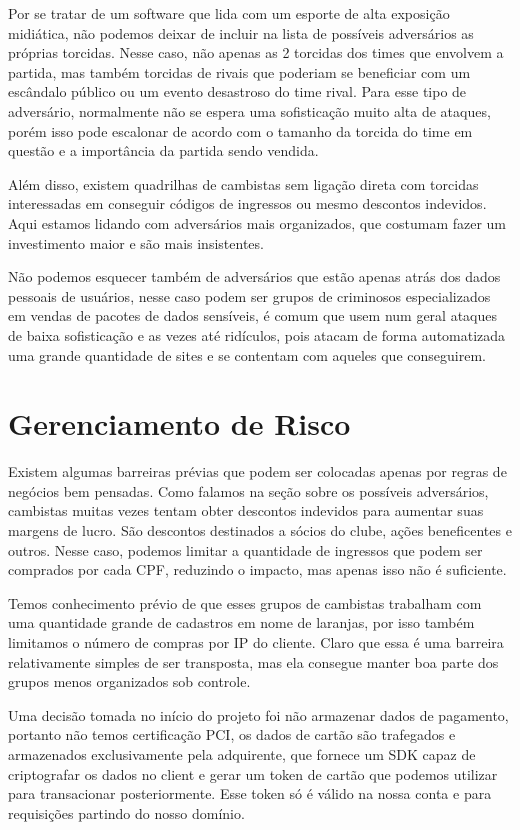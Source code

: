 \documentclass[12pt]{article}
\begin{document}
Por se tratar de um software que lida com um esporte de alta exposição midiática, não podemos deixar de incluir na lista de possíveis adversários as próprias torcidas. Nesse caso, não apenas as 2 torcidas dos times que envolvem a partida, mas também torcidas de rivais que poderiam se beneficiar com um escândalo público ou um evento desastroso do time rival. Para esse tipo de adversário, normalmente não se espera uma sofisticação muito alta de ataques, porém isso pode escalonar de acordo com o tamanho da torcida do time em questão e a importância da partida sendo vendida.

Além disso, existem quadrilhas de cambistas sem ligação direta com torcidas interessadas em conseguir códigos de ingressos ou mesmo descontos indevidos. Aqui estamos lidando com adversários mais organizados, que costumam fazer um investimento maior e são mais insistentes.

Não podemos esquecer também de adversários que estão apenas atrás dos dados pessoais de usuários, nesse caso podem ser grupos de criminosos especializados em vendas de pacotes de dados sensíveis, é comum que usem num geral ataques de baixa sofisticação e as vezes até ridículos, pois atacam de forma automatizada uma grande quantidade de sites e se contentam com aqueles que conseguirem.

\section*{Gerenciamento de Risco}

Existem algumas barreiras prévias que podem ser colocadas apenas por regras de negócios bem pensadas. Como falamos na seção sobre os possíveis adversários, cambistas muitas vezes tentam obter descontos indevidos para aumentar suas margens de lucro. São descontos destinados a sócios do clube, ações beneficentes e outros. Nesse caso, podemos limitar a quantidade de ingressos que podem ser comprados por cada CPF, reduzindo o impacto, mas apenas isso não é suficiente. 

Temos conhecimento prévio de que esses grupos de cambistas trabalham com uma quantidade grande de cadastros em nome de laranjas, por isso também limitamos o número de compras por IP do cliente. Claro que essa é uma barreira relativamente simples de ser transposta, mas ela consegue manter boa parte dos grupos menos organizados sob controle.

Uma decisão tomada no início do projeto foi não armazenar dados de pagamento, portanto não temos certificação PCI, os dados de cartão são trafegados e armazenados exclusivamente pela adquirente, que fornece um SDK capaz de criptografar os dados no client e gerar um token de cartão que podemos utilizar para transacionar posteriormente. Esse token só é válido na nossa conta e para requisições partindo do nosso domínio.
\end{document}
